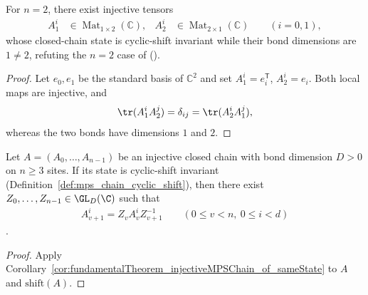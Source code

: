 \begin{lemma}%
    \label{thm:peps_cycle_two_site_bond_uniformity_counterexample}
    \leanok
    For $n=2$, there exist injective tensors
    \begin{align}
        A_1^i & \in\operatorname{Mat}_{1\times2}(\mathbb C),
              & A_2^i                                        & \in\operatorname{Mat}_{2\times1}(\mathbb C)
        \qquad (i=0,1),
        \label{eq:peps_cycle_two_site_rectangular_tensors}
    \end{align}
    whose closed-chain state is cyclic-shift invariant while their bond
    dimensions are $1\neq 2$, refuting the $n=2$ case of
    \cite[lines~1803--1805]{Molnar2018NormalPEPS}
    (\cite{gap:peps_cyclic_mps_two_site_bond_uniformity}).
\end{lemma}
\begin{proof}\leanok
    Let $e_0,e_1$ be the standard basis of $\mathbb C^2$ and set
    $A_1^i=e_i^{\mathsf T}$, $A_2^i=e_i$. Both local maps are injective, and
    \begin{align}
        \tr(A_1^iA_2^j)=\delta_{ij}=\tr(A_2^iA_1^j),
        \label{eq:peps_cycle_two_site_shift_invariance}
    \end{align}
    whereas the two bonds have dimensions $1$ and $2$.
\end{proof}

\begin{lemma}%
    \label{cor:fundamentalTheorem_injectiveMPSChain_cyclicShift}
    \leanok
    Let $A=(A_0,\ldots,A_{n-1})$ be an injective closed chain with bond
    dimension $D>0$ on $n\ge 3$ sites. If its state is cyclic-shift invariant
    (Definition~\ref{def:mps_chain_cyclic_shift}), then there exist
    $Z_0,\ldots,Z_{n-1}\in\GL_D(\C)$ such that
    \begin{align}
        A_{v+1}^i = Z_v A_v^i Z_{v+1}^{-1}
        \qquad (0\le v<n,\ 0\le i<d)
        \label{eq:peps_cyclic_shift_gauge}
    \end{align}
    \cite[lines~1807--1824]{Molnar2018NormalPEPS}.
\end{lemma}
\begin{proof}\leanok
    Apply Corollary~\ref{cor:fundamentalTheorem_injectiveMPSChain_of_sameState}
    to $A$ and $\mathrm{shift}(A)$.
\end{proof}

